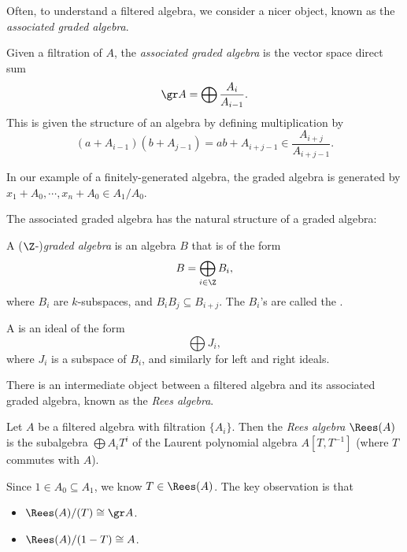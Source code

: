 \documentclass[a4paper]{article}
\begin{document}
Often, to understand a filtered algebra, we consider a nicer object, known as the \emph{associated graded algebra}.
\begin{defi}
  Given a filtration of $A$, the \emph{associated graded algebra} is the vector space direct sum
  \[
    \gr A = \bigoplus \frac{A_i}{A_{i - 1}}.
  \]
  This is given the structure of an algebra by defining multiplication by
  \[
    (a + A_{i - 1}) (b + A_{j - 1}) = ab + A_{i + j - 1} \in \frac{A_{i + j}}{A_{i + j - 1}}.
  \]
\end{defi}
In our example of a finitely-generated algebra, the graded algebra is generated by $x_1 + A_0, \cdots, x_n + A_0 \in A_1/A_0$.

The associated graded algebra has the natural structure of a graded algebra:
\begin{defi}
  A ($\Z$-)\emph{graded algebra} is an algebra $B$ that is of the form
  \[
    B = \bigoplus_{i \in \Z} B_i,
  \]
  where $B_i$ are $k$-subspaces, and $B_i B_j \subseteq B_{i + j}$. The $B_i$'s are called the .

  A  is an ideal of the form
  \[
    \bigoplus J_i,
  \]
  where $J_i$ is a subspace of $B_i$, and similarly for left and right ideals.
\end{defi}

There is an intermediate object between a filtered algebra and its associated graded algebra, known as the \emph{Rees algebra}.
\begin{defi}
  Let $A$ be a filtered algebra with filtration $\{A_i\}$. Then the \emph{Rees algebra} $\Rees(A)$ is the subalgebra $\bigoplus A_i T^i$ of the Laurent polynomial algebra $A[T, T^{-1}]$ (where $T$ commutes with $A$).
\end{defi}

Since $1 \in A_0 \subseteq A_1$, we know $T \in \Rees(A)$. The key observation is that
\begin{itemize}
  \item $\Rees(A)/(T) \cong \gr A$.
  \item $\Rees(A)/(1 - T) \cong A$.
\end{itemize}
\end{document}
